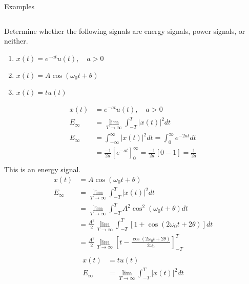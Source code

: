 \begin{frame}{Examples}
    \begin{columns}[t]
        \begin{column}{0.5\textwidth}
            Determine whether the following signals are energy signals, power signals, or neither.
            \begin{enumerate}[<alert@+>]
                \item $x(t) = e^{-at}u(t), \quad a>0$
                \item $x(t) = A\cos(\omega_0t+\theta)$
                \item $x(t) = tu(t)$
            \end{enumerate}
            \vspace{-0.2in}
            \begin{overprint}
                \begin{align*}
                    x(t) &= e^{-at}u(t), \quad a>0\\
                    E_\infty &=  \lim_{T\rightarrow \infty}\int_{-T}^{T}|x(t)|^2dt\\
                    E_\infty &=  \int_{-\infty}^{\infty}|x(t)|^2dt =  \int_{0}^{\infty}e^{-2at}dt\\
                    &= \frac{-1}{2a}\left[e^{-at}\right]_0^\infty = \frac{-1}{2a}[0 -1] = \frac{1}{2a}\\
                \end{align*}
                This is an energy signal.
                \begin{align*}
                    x(t) &= A\cos(\omega_0t+\theta)\\
                    E_\infty &=  \lim_{T\rightarrow \infty}\int_{-T}^{T}|x(t)|^2dt\\
                    &=  \lim_{T\rightarrow \infty}\int_{-T}^{T}A^2\cos^2(\omega_0t+\theta)dt\\
                    &= \frac{A^2}{2}\lim_{T\rightarrow \infty}\int_{-T}^{T}[1+ \cos(2\omega_0t+2\theta)]dt\\
                    &= \frac{A^2}{2}\lim_{T\rightarrow \infty}\left[t - \frac{\cos(2\omega_0t+2\theta)}{2\omega_0}\right]_{-T}^{T}\\
                \end{align*}
                \begin{align*}
                    x(t) &= tu(t)\\
                    E_\infty &=  \lim_{T\rightarrow \infty}\int_{-T}^{T}|x(t)|^2dt\\

\end{align*}
\end{overprint}
\end{column}
\end{columns}
\end{frame}
